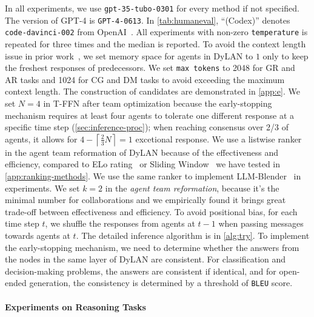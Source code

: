 \documentclass{article} %
\begin{document}
In all experiments, we use \texttt{gpt-35-tubo-0301} for every method if not specified. The version of GPT-4 is \texttt{GPT-4-0613}. In \cref{tab:humaneval}, ``(Codex)'' denotes \texttt{code-davinci-002} from OpenAI~\citep{human-eval,openai2023gpt4}. All experiments with non-zero \texttt{temperature} is repeated for three times and the median is reported. To avoid the context length issue in prior work~\citep{debate1-mit, agent-bench}, we set memory space for agents in DyLAN to $1$ only to keep the freshest responses of predecessors. We set \texttt{max tokens} to 2048 for GR and AR tasks and 1024 for CG and DM tasks to avoid exceeding the maximum context length. The construction of candidates are demonstrated in \cref{app:e}. We set $N=4$ in T-FFN after team optimization because the early-stopping mechanism requires at least four agents to tolerate one different response at a specific time step (\cref{sec:inference-proc}); when reaching consensus over 2/3 of agents, it allows for $4- \left \lceil{\frac{2}{3}N}\right \rceil = 1$ excetional response. We use a listwise ranker in the agent team reformation of DyLAN because of the effectiveness and efficiency, compared to ELo rating~\citep{trueskill} or Sliding Window~\citep{sliding-window} we have tested in \cref{app:ranking-methods}. We use the same ranker to implement LLM-Blender~\citep{blender} in experiments. We set $k=2$ in the \textit{agent team reformation}, because it’s the minimal number for collaborations and we empirically found it brings great trade-off between effectiveness and efficiency. To avoid positional bias, for each time step $t$, we shuffle the responses from agents at $t-1$ when passing messages towards agents at $t$. The detailed inference algorithm is in \cref{alg:try}. To implement the early-stopping mechanism, we need to determine whether the answers from the nodes in the same layer of DyLAN are consistent. For classification and decision-making problems, the answers are consistent if identical, and for open-ended generation, the consistency is determined by a threshold of \texttt{BLEU} score. 



\paragraph{Experiments on Reasoning Tasks}
\end{document}
